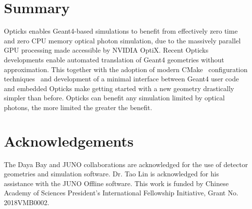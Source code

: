 \documentclass{webofc}
\begin{document}
\section{Summary}
%
Opticks enables Geant4-based simulations to benefit from effectively zero time 
and zero CPU memory optical photon simulation, due to the massively parallel GPU 
processing made accessible by NVIDIA OptiX.
Recent Opticks developments enable automated translation of Geant4 geometries without approximation. 
This together with the adoption of modern CMake~\cite{CMake} configuration techniques~\cite{BCM} and development of a 
minimal interface between Geant4 user code and embedded Opticks make getting started with a new geometry
drastically simpler than before.
Opticks can benefit any simulation limited by optical photons, the more limited the greater the 
benefit.
%
%
\section*{Acknowledgements}
%
The Daya Bay and JUNO collaborations are acknowledged for the use of detector 
geometries and simulation software. Dr. Tao Lin is acknowledged for his assistance with 
the JUNO Offline software. 
This work is funded by Chinese Academy of Sciences President’s International Fellowship Initiative,
Grant No. 2018VMB0002.
%
%
\end{document}
